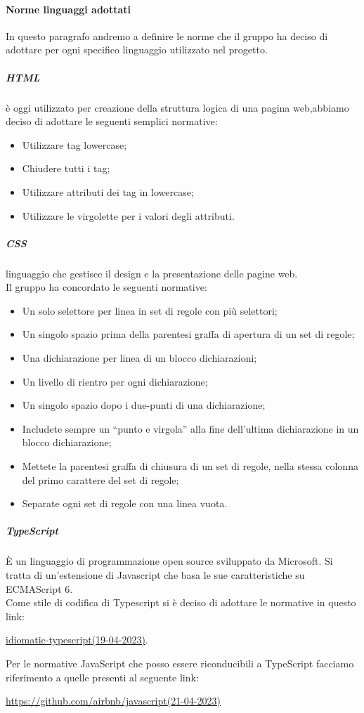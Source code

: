 	\paragraph{Norme linguaggi adottati} 
 	In questo paragrafo andremo a definire le norme che il gruppo ha deciso di adottare per ogni specifico linguaggio utilizzato nel progetto.
	\subparagraph*{HTML} è oggi utilizzato per creazione della struttura logica di una pagina web,abbiamo 	 deciso di adottare le seguenti semplici normative:
	\begin{itemize}
	\item Utilizzare tag lowercase;
	\item Chiudere tutti i tag;
	\item Utilizzare attributi dei tag in lowercase;
	\item Utilizzare le virgolette per i valori degli attributi.
	\end{itemize}	
	
	\subparagraph*{CSS} linguaggio che gestisce il design e la presentazione delle pagine web. \\
	Il gruppo ha concordato le seguenti normative:
	\begin{itemize}
	\item Un solo selettore per linea in set di regole con più selettori;
	\item Un singolo spazio prima della parentesi graffa di apertura di un set di regole;
	\item Una dichiarazione per linea di un blocco dichiarazioni;
	\item  Un livello di rientro per ogni dichiarazione;
	\item Un singolo spazio dopo i due-punti di una dichiarazione;
	\item Includete sempre un “punto e virgola” alla fine dell'ultima dichiarazione in un blocco dichiarazione;
	\item Mettete la parentesi graffa di chiusura di un set di regole, nella stessa colonna del primo carattere del set di regole;
	\item Separate ogni set di regole con una linea vuota.
	\end{itemize}
	
	\subparagraph*{TypeScript} È un linguaggio di programmazione open source sviluppato da Microsoft.
Si tratta di un’estensione di Javascript che basa le sue caratteristiche su ECMAScript 6. \\
Come stile di codifica di Typescript si è deciso di adottare le normative in questo link:
\begin{center}
\href{https://github.com/roblarsen/idiomatic-typescript}{idiomatic-typescript(19-04-2023)}.
\end{center}
Per le normative JavaScript che posso essere riconducibili a TypeScript facciamo riferimento a quelle presenti al seguente link:
\begin{center}
\href{https://github.com/airbnb/javascript}{https://github.com/airbnb/javascript(21-04-2023)}
\end{center}

